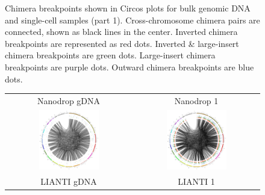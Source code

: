 \begin{figure}
\begin{tabular}{cc}
\end{tabular}
\caption[Chimera breakpoints shown in Circos plots (part 1)]{Chimera breakpoints shown in Circos plots for bulk genomic DNA and single-cell samples (part 1). Cross-chromosome chimera pairs are connected, shown as black lines in the center. Inverted chimera breakpoints are represented as red dots. Inverted \& large-insert chimera breakpoints are green dots. Large-insert chimera breakpoints are purple dots. Outward chimera breakpoints are blue dots.}
\label{fig:LX0gDNAcircos}
\end{figure}

\begin{figure}
\begin{tabular}{cc}
Nanodrop gDNA & Nanodrop 1 \\
\includegraphics[keepaspectratio,width=0.5\textwidth]{./figures/circos/SRR3749000gDNA_0529} & \includegraphics[keepaspectratio,width=0.5\textwidth]{./figures/circos/SRR3749174_0529} \\
LIANTI gDNA & LIANTI 1 \\

\end{tabular}
\end{figure}
